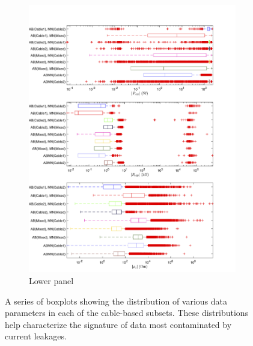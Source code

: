 \documentclass[final,authoryear,5p,times,twocolumn]{elsarticle}
\begin{document}
\begin{figure}[!ht]
   \begin{subfigure}[b]{0.86\linewidth}
       \centering
       \includegraphics[trim=0cm 0.3cm 2cm 2cm, clip=true, width=\linewidth]{./Figures/Fig9b.png}
       \caption{Lower panel}
       \label{fig:CableSplit_Cluster_PropBoxPlot2}
   \end{subfigure}

   \caption{A series of boxplots showing the distribution of various data parameters in each of the cable-based subsets. These distributions help characterize the signature of data most contaminated by current leakages.}
   \label{fig:CableSplit_Cluster_PropBoxPlots}
\end{figure}
\end{document}

